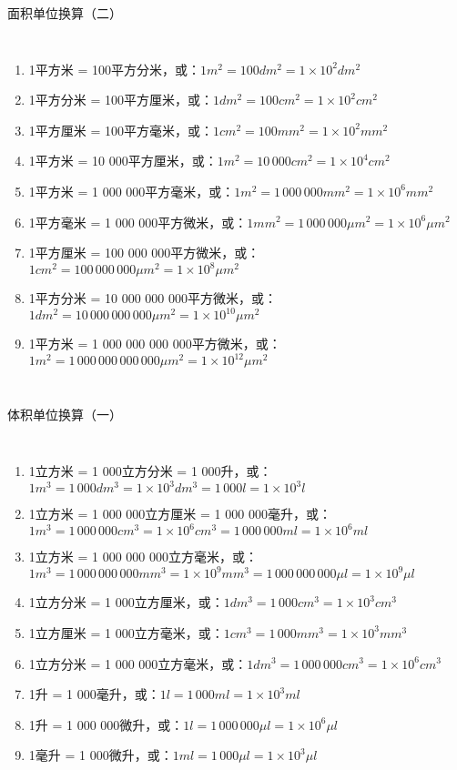 \documentclass[aspectratio=169]{ctexbeamer} %
\begin{document}
\begin{frame}[t]{面积单位换算（二）}
\begin{columns}
\begin{enumerate}[label={\Alph*.}]
\item 1平方米 = 100平方分米，或：$1m^2 = 100 dm^2 = 1 \times 10^2 dm^2$ 
\item 1平方分米 = 100平方厘米，或：$1dm^2 = 100 cm^2 = 1 \times 10^2 cm^2$ 
\item 1平方厘米 = 100平方毫米，或：$1cm^2 = 100 mm^2 = 1 \times 10^2 mm^2$ 
\item 1平方米 = 10 000平方厘米，或：$1m^2 = 10\,000 cm^2 = 1 \times 10^4 cm^2$ 
\item 1平方米 = 1 000 000平方毫米，或：$1m^2 = 1 \, 000 \, 000 mm^2 = 1 \times 10^6 mm^2$ 
\item 1平方毫米 = 1 000 000平方微米，或：$1mm^2 = 1 \, 000 \, 000 \mu m^2 = 1 \times 10^6  \mu m^2$ 
\item 1平方厘米 = 100 000 000平方微米，或：$1cm^2 = 100 \, 000 \, 000  \mu m^2 = 1 \times 10^8  \mu m^2$ 
\item 1平方分米 = 10 000 000 000平方微米，或：$1dm^2 = 10 \, 000 \, 000 \, 000  \mu m^2 = 1 \times 10^{10}  \mu m^2$ 
\item 1平方米 = 1 000 000 000 000平方微米，或：$1m^2 = 1 \, 000 \, 000 \, 000 \, 000 \mu m^2 = 1 \times 10^{12}  \mu m^2$ 
\end{enumerate}
\end{columns}
\end{frame}

\begin{frame}[t]{体积单位换算（一）}
\begin{columns}
\begin{enumerate}[label={\Alph*.}]
\item 1立方米 = 1 000立方分米 = 1 000升，或：$1m^3 = 1 \, 000 dm^3 = 1 \times 10^3 dm^3 = 1 \, 000 l =  1 \times 10^3 l$ 
\item 1立方米 = 1 000 000立方厘米 = 1 000 000毫升，或：$1m^3 = 1 \, 000 \, 000 cm^3 = 1 \times 10^6 cm^3 = 1 \, 000 \, 000 ml = 1 \times 10^6 ml$ 
\item 1立方米 = 1 000 000 000立方毫米，或：$1m^3 = 1 \, 000 \, 000 \, 000 mm^3 = 1 \times 10^9 mm^3 = 1 \, 000 \, 000 \, 000 \mu l = 1 \times 10^9 \mu l$ 
\item 1立方分米 = 1 000立方厘米，或：$1dm^3 = 1 \, 000 cm^3 = 1 \times 10^3 cm^3$ 
\item 1立方厘米 = 1 000立方毫米，或：$1cm^3 = 1 \, 000 mm^3 = 1 \times 10^3 mm^3$ 
\item 1立方分米 = 1 000 000立方毫米，或：$1dm^3 = 1 \, 000 \, 000 cm^3 = 1 \times 10^6 cm^3$ 
\item 1升 = 1 000毫升，或：$1 l = 1 \, 000 ml = 1 \times 10^3 ml$ 
\item 1升 = 1 000 000微升，或：$1 l = 1 \,000 \, 000 \mu l = 1 \times 10^6 \mu l$ 
\item 1毫升 = 1 000微升，或：$1 ml = 1 \, 000 \mu l = 1 \times 10^3 \mu l$ 
\end{enumerate}
\end{columns}
\end{frame}
\end{document}
